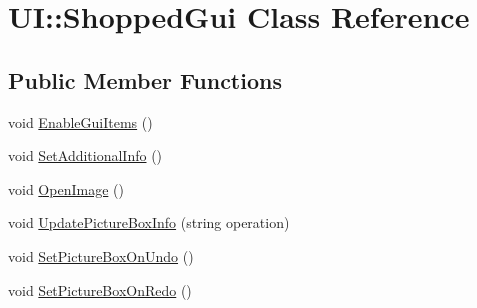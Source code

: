 \hypertarget{class_u_i_1_1_shopped_gui}{
\section{UI::ShoppedGui Class Reference}
\label{class_u_i_1_1_shopped_gui}
}
\subsection*{Public Member Functions}
\begin{DoxyCompactItemize}
\item 
void \hyperlink{class_u_i_1_1_shopped_gui_a190bba777e57891c8042b86afbba83c6}{EnableGuiItems} ()
\item 
void \hyperlink{class_u_i_1_1_shopped_gui_a292a827437d7f2098c13bc1a735a569e}{SetAdditionalInfo} ()
\item 
void \hyperlink{class_u_i_1_1_shopped_gui_a3a27f074b7b204b1df148921a0dcc20c}{OpenImage} ()
\item 
void \hyperlink{class_u_i_1_1_shopped_gui_a74a1accbbc8cb69ea61830d9bfcd302c}{UpdatePictureBoxInfo} (string operation)
\item 
void \hyperlink{class_u_i_1_1_shopped_gui_a62a62fa927ca572fb7d19f8116fc8858}{SetPictureBoxOnUndo} ()
\item 
void \hyperlink{class_u_i_1_1_shopped_gui_ab6fbc914ecb121fa800ec2834daa4f37}{SetPictureBoxOnRedo} ()
\end{DoxyCompactItemize}
